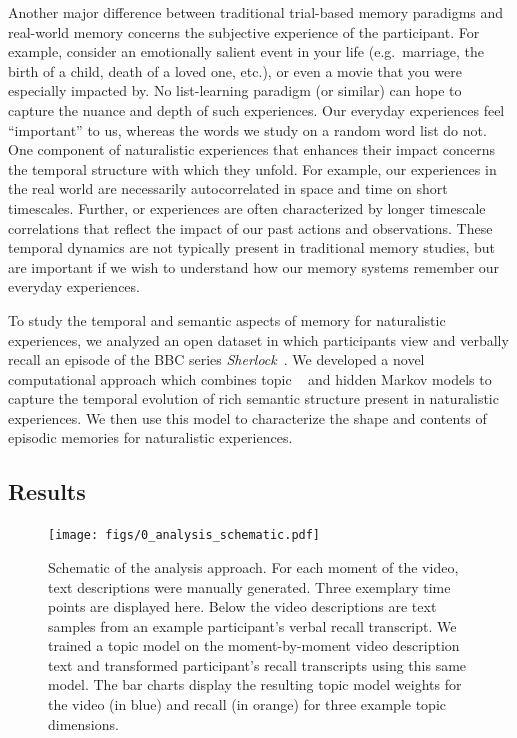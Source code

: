 \documentclass{article}
\begin{document}
{Another major difference between traditional trial-based memory paradigms and real-world memory concerns the subjective experience of the participant.  For example, consider an emotionally salient event in your life (e.g.\ marriage, the birth of a child, death of a loved one, etc.), or even a movie that you were especially impacted by.  No list-learning paradigm (or similar) can hope to capture the nuance and depth of such experiences.  Our everyday experiences feel ``important'' to us, whereas the words we study on a random word list do not.  One component of naturalistic experiences that enhances their impact concerns the temporal structure with which they unfold.  For example, our experiences in the real world are necessarily autocorrelated in space and time on short timescales.  Further, or experiences are often characterized by longer timescale correlations that reflect the impact of our past actions and observations.  These temporal dynamics are not typically present in traditional memory studies, but are important if we wish to understand how our memory systems remember our everyday experiences.


To study the temporal and semantic aspects of memory for naturalistic experiences, we analyzed an open dataset in which participants view and verbally recall an episode of the BBC series \textit{Sherlock}~\citep{ChenEtal17}.  We developed a novel computational approach which combines topic ~\cite{Blei03} and hidden Markov models to capture the temporal evolution of rich semantic structure present in naturalistic experiences. We then use this model to characterize the shape and contents of episodic memories for naturalistic experiences.

\subsection{Results}

\begin{figure}[t!]
\centering
\texttt{[image: figs/0\_analysis\_schematic.pdf]}
\caption{\label{fig:schematic}Schematic of the analysis approach. For each moment of the video, text descriptions were manually generated. Three exemplary time points are displayed here.  Below the video descriptions are text samples from an example participant's verbal recall transcript.  We trained a topic model on the moment-by-moment video description text and transformed participant's recall transcripts using this same model. The bar charts display the resulting topic model weights for the video (in blue) and recall (in orange) for three example topic dimensions.}
\end{figure}

}
\end{document}
